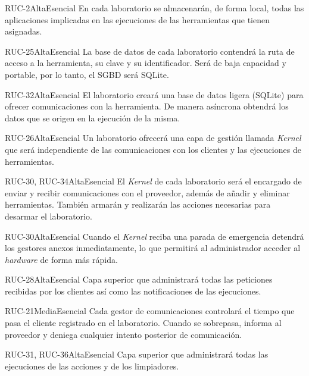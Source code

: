 {RUC-2}{Alta}{Esencial}
{
En cada laboratorio se almacenarán, de forma local, todas las 
aplicaciones implicadas en las ejecuciones de las herramientas que 
tienen asignadas. 
}

{RUC-25}{Alta}{Esencial}
{
La base de datos de cada laboratorio contendrá la ruta de acceso a la 
herramienta, su clave y su identificador. Será de baja capacidad y 
portable, por lo tanto, el SGBD será SQLite.
}

{RUC-32}{Alta}{Esencial}
{
El laboratorio creará una base de datos ligera (SQLite) para ofrecer 
comunicaciones con la herramienta. De manera asíncrona obtendrá los 
datos que se origen en la ejecución de la misma.
}

{RUC-26}{Alta}{Esencial}
{
Un laboratorio ofrecerá una capa de gestión llamada \emph{Kernel} que 
será independiente de las comunicaciones con los clientes y las 
ejecuciones de herramientas.
}

{RUC-30, RUC-34}{Alta}{Esencial}
{
El \emph{Kernel} de cada laboratorio será el encargado de enviar y 
recibir comunicaciones con el proveedor, además de añadir y eliminar 
herramientas. También armarán y realizarán las acciones necesarias 
para desarmar el laboratorio.
}

{RUC-30}{Alta}{Esencial}
{
Cuando el \emph{Kernel} reciba una parada de emergencia detendrá los 
gestores anexos inmediatamente, lo que permitirá al administrador 
acceder al \emph{hardware} de forma más rápida.
}

{RUC-28}{Alta}{Esencial}
{
Capa superior que administrará todas las peticiones recibidas por los 
clientes así como las notificaciones de las ejecuciones.
}

{RUC-21}{Media}{Esencial}
{
Cada gestor de comunicaciones controlará el tiempo que pasa el cliente 
registrado en el laboratorio. Cuando se sobrepasa, informa al 
proveedor y deniega cualquier intento posterior de comunicación.
}

{RUC-31, RUC-36}{Alta}{Esencial}
{
Capa superior que administrará todas las ejecuciones de las acciones y 
de los limpiadores.
}

